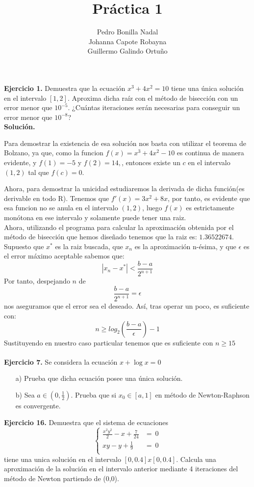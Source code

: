 \documentclass[11pt]{article}
\title{\textbf{Práctica 1}}
\author{Pedro Bonilla Nadal\\
		Johanna Capote Robayna\\
		Guillermo Galindo Ortuño}
\date{}
\begin{document}
\maketitle

\textbf{Ejercicio 1.}
Demuestra que la ecuaci\'on $x^3 + 4x^2 = 10 $ tiene una \'unica soluci\'on en el intervalo $ [1,2] $. Aproxima dicha ra\'iz con el m\'etodo de bisecci\'on con un error menor que $10^{-5}$. ¿Cu\'antas iteraciones ser\'an necesarias para conseguir un error menor que $10^{-8}$?
\\

\textbf{Solución.}

Para demostrar la existencia de esa solución nos basta con utilizar el teorema de Bolzano, ya que, como la funcion $f(x)=x^3 +4x^2 -10$ es continua de manera evidente, y $f(1) = -5$ y $f(2) =  14,$, entonces existe un $c$ en el intervalo $(1,2)$ tal que $f(c) = 0$.

Ahora, para demostrar la unicidad estudiaremos la derivada de dicha función(es derivable en todo
 R). Tenemos que $f'(x) = 3x^2 +8x$, por tanto, es evidente que esa funcion no se anula en el intervalo $(1,2)$, luego $f(x)$ es estrictamente monótona en ese intervalo y solamente puede tener una raiz.
\\

Ahora, utilizando el programa para calcular la aproximación obtenida por el método de bisección que hemos diseñado tenemos que la raiz es: $1.36522674$.
\\

Supuesto que $x^*$ es la raiz buscada, que $x_n$ es la aproximación n-ésima, y que $\epsilon$ es el error máximo aceptable sabemos que:
$$|x_n - x^*| < \frac{b-a}{2^{n+1}}$$
Por tanto, despejando $n$ de
$$\frac{b-a}{2^{n+1}} = \epsilon$$
nos aseguramos que el error sea el deseado. Así, tras operar un poco, es suficiente con:
$$ n \geq log_2(\frac{b-a}{\epsilon})-1$$
Sustituyendo en nuestro caso particular tenemos que es suficiente con $n \geq 15$
\\ \\

\textbf{Ejercicio 7.}
Se considera la ecuaci\'on $x + \log x = 0$
\begin{itemize}
\item[a)]Prueba que dicha ecuaci\'on posee una \'unica soluci\'on.
\item[b)] Sea $a \in (0, \frac{1}{2})$. Prueba que  si $x_0 \in [a,1]$ en m\'etodo de Newton-Raphson es convergente.

\end{itemize}
\textbf{Ejercicio 16.}
Demuestra que el sistema de ecuaciones
$$\begin{cases}
\frac{x^2y^2}{2} - x + \frac{7}{24} &= \ 0 \\
xy - y + \frac{1}{9} &= \ 0\\
\end{cases}$$
tiene una unica soluci\'on en el intervalo $[0, 0.4]x[0, 0.4]$. Calcula una aproximaci\'on de la soluci\'on en el intervalo anterior mediante 4 iteraciones del m\'etodo de Newton partiendo de (0,0).
\\
\end{document}
